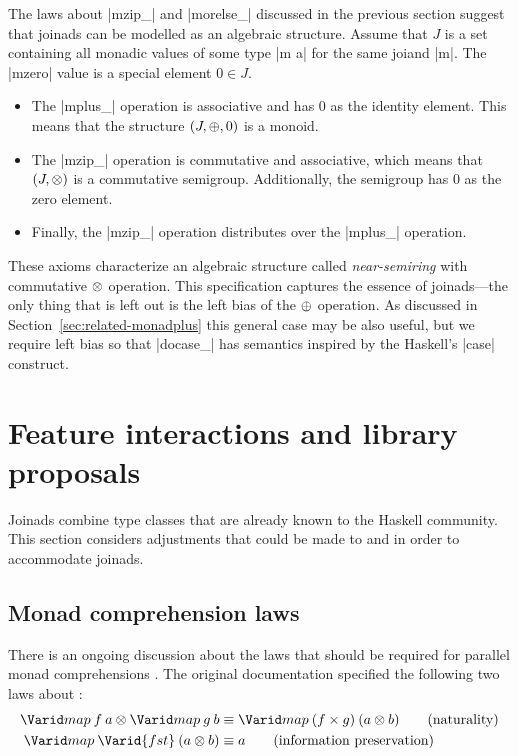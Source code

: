 \documentclass{sigplanconf}
\begin{document}
The laws about |mzip_| and |morelse_| discussed in the previous section suggest that 
joinads can be modelled as an algebraic structure. Assume that $J$ is a set containing all monadic 
values of some type |m a| for the same joiand |m|. The |mzero| value is a special element $0 \in J$.
\begin{itemize}
\item The |mplus_| operation is associative and has $0$ as the identity element. This means that the
  structure $(J, \oplus, 0)$ is a monoid.

\item The |mzip_| operation is commutative and associative, which means that $(J, \otimes)$ is a 
  commutative semigroup. Additionally, the semigroup has $0$ as the zero element.
  
\item Finally, the |mzip_| operation distributes over the |mplus_| operation.
\end{itemize}
These axioms characterize an algebraic structure called \textit{near-semiring} with commutative
$\otimes$ operation. This specification captures the essence of joinads---the only 
thing that is left out is the left bias of the $\oplus$ operation. As discussed in 
Section~\ref{sec:related-monadplus} this general case may be also useful, but we require left bias
so that |docase_| has semantics inspired by the Haskell's |case| construct.


\section{Feature interactions and library proposals}
\label{sec:proposals}

Joinads combine type classes that are already known to the Haskell 
community. This section considers adjustments that could be made to  and 
 in order to accommodate joinads.


\subsection{Monad comprehension laws} 
\label{sec:proposals-mzip}

There is an ongoing discussion about the laws that should be required for parallel monad 
comprehensions \cite{bringbackmc, comprefun}. The original documentation specified the following two laws
about :
\begin{align*}
  \map \: f \: a \mzip \map \: g \: b &\equiv \map \: (f \times g) \: (a \mzip b) \tag{naturality} \\
  \map \: \Varid{fst} \: (a \mzip b) &\equiv a \tag{information preservation} 
\end{align*}
\end{document}
